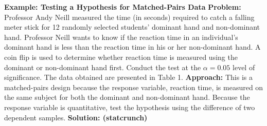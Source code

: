 \documentclass{report}
\begin{document}
    \pagebreak \bigbreak \noindent 
    \begin{mdframed}
      \textbf{Example: Testing a Hypothesis for Matched-Pairs Data}
      \bigbreak \noindent 
      \textbf{Problem:}
      Professor Andy Neill measured the time (in seconds) required to catch a falling meter stick for 12 randomly selected students' dominant hand and non-dominant hand. Professor Neill wants to know if the reaction time in an individual's dominant hand is less than the reaction time in his or her non-dominant hand. A coin flip is used to determine whether reaction time is measured using the dominant or non-dominant hand first. Conduct the test at the $\alpha = 0.05$ level of significance. The data obtained are presented in Table 1.
      \bigbreak \noindent 
        \bigbreak \noindent 
      \textbf{Approach:}
      This is a matched-pairs design because the response variable, reaction time, is measured on the same subject for both the dominant and non-dominant hand. Because the response variable is quantitative, test the hypothesis using the difference of two dependent samples.
      \bigbreak \noindent 
      \textbf{Solution: (statcrunch)}

\end{mdframed}
\end{document}
